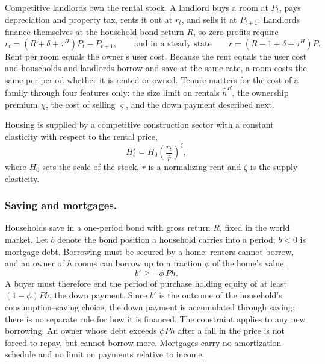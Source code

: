 Competitive landlords own the rental stock. A landlord buys a room at $P_t$,
pays depreciation and property tax, rents it out at $r_t$, and sells it at
$P_{t+1}$. Landlords finance themselves at the household bond return $R$, so
zero profits require
\begin{equation}
 r_t=(R+\delta+\tau^H)P_t-P_{t+1},
 \qquad\text{and in a steady state}\qquad
 r=(R-1+\delta+\tau^H)P .
 \label{eq:m5-rent}
\end{equation}
Rent per room equals the owner's user cost.
Because the rent equals the user cost and households and landlords borrow and
save at the same rate, a room costs the same per period whether it is rented or
owned. Tenure matters for the cost of a family through four features only: the
size limit on rentals $\bar h^R$, the ownership premium $\chi$, the cost of
selling $\varsigma$, and the down payment described next.

Housing is supplied by a competitive construction sector with a constant
elasticity with respect to the rental price,
\begin{equation}
 H^s_t=H_0\left(\frac{r_t}{\bar r}\right)^{\zeta},
 \label{eq:m5-supply}
\end{equation}
where $H_0$ sets the scale of the stock, $\bar r$ is a normalizing rent and
$\zeta$ is the supply elasticity.

\subsubsection*{Saving and mortgages.}
Households save in a one-period bond with gross return $R$, fixed in the world
market. Let $b$ denote the bond position a household carries into a period;
$b<0$ is mortgage debt. Borrowing must be secured by a home: renters cannot
borrow, and an owner of $h$ rooms can borrow up to a fraction $\phi$ of the
home's value,
\begin{equation}
 b'\geq-\phi\,P h .
 \label{eq:m5-ltv}
\end{equation}
A buyer must therefore end the period of purchase holding equity of at least
$(1-\phi)Ph$, the down payment. Since $b'$ is the outcome of the household's
consumption--saving choice, the down payment is accumulated through saving;
there is no separate rule for how it is financed. The constraint applies to
any new borrowing. An owner whose debt exceeds $\phi Ph$ after a fall in the
price is not forced to repay, but cannot borrow more. Mortgages carry no
amortization schedule and no limit on payments relative to income.

